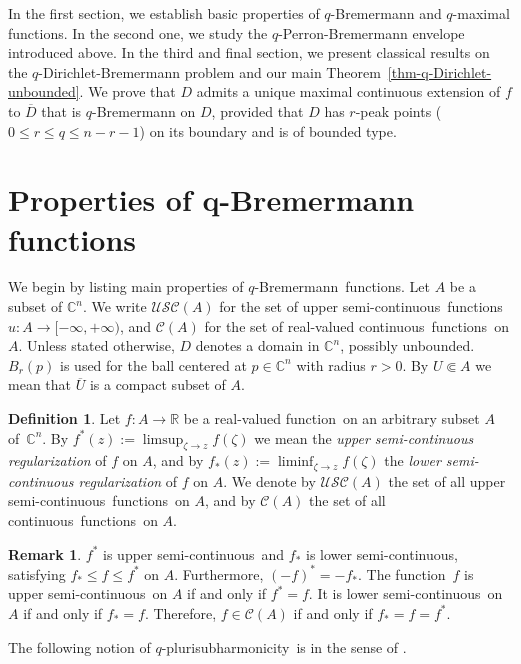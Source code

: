 \documentclass[reqno]{amsart}
\theoremstyle{definition}
\newtheorem{defn}[thm]{Definition}
\newtheorem{rem}[thm]{Remark}
\numberwithin{equation}{section}
\newcommand{\cbb}{\mathbb{C}}
\newcommand{\rbb}{\mathbb{R}}
\newcommand{\ccal}{\mathcal{C}}
\newcommand{\USC}{\mathcal{USC}}
\newcommand{\qbrem}{$q$-Bremermann}
\newcommand{\qpshy}{$q$-pluri\-sub\-harmonicity}
\newcommand{\cl}[1]{\overline{#1}}
\newcommand{\cont}{continuous}
\newcommand{\usc}{upper semi-continuous}
\newcommand{\lsc}{lower semi-continuous}
\newcommand{\fct}{function}
\newcommand{\fcts}{functions}
\newcommand{\cld}{\overline{D}}
\newcommand{\relc}{\Subset}
\begin{document}
In the first section, we establish basic properties of $q$-Bremermann and $q$-maximal functions. In the second one, we study the $q$-Perron-Bremermann envelope introduced above. In the third and final section, we present classical results on the $q$-Dirichlet-Bremermann problem and our main Theorem~\ref{thm-q-Dirichlet-unbounded}. We prove that $D$ admits a unique maximal continuous extension of $f$ to $\cld$ that is $q$-Bremermann on $D$, provided that $D$ has $r$-peak points ($0 \leq r \leq q \leq n-r-1$) on its boundary and is of bounded type.

\section{Properties of q-Bremermann functions}\label{sec-prop-q-brem}

We begin by listing main properties of \qbrem\ \fcts. Let $A$ be a subset of $\cbb^n$. We write $\USC(A)$ for the set of \usc\ \fcts\ $u:A\to[-\infty,+\infty)$, and $\ccal(A)$ for the set of real-valued \cont\ \fcts\ on $A$. Unless stated otherwise, $D$ denotes a domain in $\cbb^n$, possibly unbounded. $B_r(p)$ is used for the ball centered at $p \in \cbb^n$ with radius $r>0$. By $U \relc A$ we mean that $\cl{U}$ is a compact subset of $A$.

\begin{defn} Let $f:A\to\rbb$ be a real-valued \fct\ on an arbitrary subset $A$ of~$\cbb^n$. By $f^*(z):=\limsup_{\zeta \to z} f(\zeta)$ we mean the \textit{upper semi-continuous regularization} of $f$ on $A$, and by $f_*(z):=\liminf_{\zeta \to z} f(\zeta)$ the \textit{lower semi-continuous regularization} of $f$ on $A$. We denote by $\USC(A)$ the set of all \usc\ \fcts\ on $A$, and by $\ccal(A)$ the set of all \cont\ \fcts\ on $A$.
\end{defn}

\begin{rem} $f^*$ is \usc\ and $f_*$ is \lsc, satisfying $f_* \leq f \leq f^*$ on $A$. Furthermore, $(-f)^*=-f_*$. The \fct\ $f$ is \usc\ on $A$ if and only if $f^*=f$. It is \lsc\ on $A$ if and only if $f_*=f$. Therefore, $f \in \ccal(A)$ if and only if $f_*=f=f^*$. 
\end{rem}

The following notion of \qpshy\ is in the sense of \cite{HM}.
\end{document}
